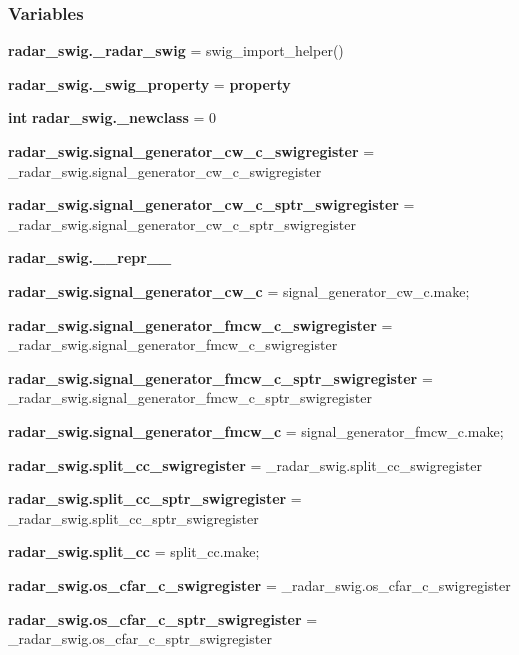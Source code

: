 \subsubsection*{Variables}
\begin{DoxyCompactItemize}
\item 
{\bf radar\+\_\+swig.\+\_\+radar\+\_\+swig} = swig\+\_\+import\+\_\+helper()
\item 
{\bf radar\+\_\+swig.\+\_\+swig\+\_\+property} = {\bf property}
\item 
{\bf int} {\bf radar\+\_\+swig.\+\_\+newclass} = 0
\item 
{\bf radar\+\_\+swig.\+signal\+\_\+generator\+\_\+cw\+\_\+c\+\_\+swigregister} = \+\_\+radar\+\_\+swig.\+signal\+\_\+generator\+\_\+cw\+\_\+c\+\_\+swigregister
\item 
{\bf radar\+\_\+swig.\+signal\+\_\+generator\+\_\+cw\+\_\+c\+\_\+sptr\+\_\+swigregister} = \+\_\+radar\+\_\+swig.\+signal\+\_\+generator\+\_\+cw\+\_\+c\+\_\+sptr\+\_\+swigregister
\item 
{\bf radar\+\_\+swig.\+\_\+\+\_\+repr\+\_\+\+\_\+}
\item 
{\bf radar\+\_\+swig.\+signal\+\_\+generator\+\_\+cw\+\_\+c} = signal\+\_\+generator\+\_\+cw\+\_\+c.\+make;
\item 
{\bf radar\+\_\+swig.\+signal\+\_\+generator\+\_\+fmcw\+\_\+c\+\_\+swigregister} = \+\_\+radar\+\_\+swig.\+signal\+\_\+generator\+\_\+fmcw\+\_\+c\+\_\+swigregister
\item 
{\bf radar\+\_\+swig.\+signal\+\_\+generator\+\_\+fmcw\+\_\+c\+\_\+sptr\+\_\+swigregister} = \+\_\+radar\+\_\+swig.\+signal\+\_\+generator\+\_\+fmcw\+\_\+c\+\_\+sptr\+\_\+swigregister
\item 
{\bf radar\+\_\+swig.\+signal\+\_\+generator\+\_\+fmcw\+\_\+c} = signal\+\_\+generator\+\_\+fmcw\+\_\+c.\+make;
\item 
{\bf radar\+\_\+swig.\+split\+\_\+cc\+\_\+swigregister} = \+\_\+radar\+\_\+swig.\+split\+\_\+cc\+\_\+swigregister
\item 
{\bf radar\+\_\+swig.\+split\+\_\+cc\+\_\+sptr\+\_\+swigregister} = \+\_\+radar\+\_\+swig.\+split\+\_\+cc\+\_\+sptr\+\_\+swigregister
\item 
{\bf radar\+\_\+swig.\+split\+\_\+cc} = split\+\_\+cc.\+make;
\item 
{\bf radar\+\_\+swig.\+os\+\_\+cfar\+\_\+c\+\_\+swigregister} = \+\_\+radar\+\_\+swig.\+os\+\_\+cfar\+\_\+c\+\_\+swigregister
\item 
{\bf radar\+\_\+swig.\+os\+\_\+cfar\+\_\+c\+\_\+sptr\+\_\+swigregister} = \+\_\+radar\+\_\+swig.\+os\+\_\+cfar\+\_\+c\+\_\+sptr\+\_\+swigregister

\end{DoxyCompactItemize}
